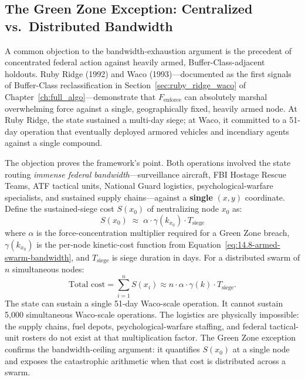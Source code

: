 \subsection{The Green Zone Exception: Centralized vs.\ Distributed Bandwidth}
\label{subsec:green_zone}

A common objection to the bandwidth-exhaustion argument is the precedent of concentrated federal action against heavily armed, Buffer-Class-adjacent holdouts. Ruby Ridge (1992) and Waco (1993)---documented as the first signals of Buffer-Class reclassification in Section~\ref{sec:ruby_ridge_waco} of Chapter~\ref{ch:full_algo}---demonstrate that $F_{\text{enforce}}$ can absolutely marshal overwhelming force against a single, geographically fixed, heavily armed node. At Ruby Ridge, the state sustained a multi-day siege; at Waco, it committed to a 51-day operation that eventually deployed armored vehicles and incendiary agents against a single compound.

The objection proves the framework's point. Both operations involved the state routing \textit{immense federal bandwidth}---surveillance aircraft, FBI Hostage Rescue Teams, ATF tactical units, National Guard logistics, psychological-warfare specialists, and sustained supply chains---against a \textbf{single} $(x, y)$ coordinate. Define the sustained-siege cost $S(x_0)$ of neutralizing node $x_0$ as:
\begin{equation}\label{eq:14.10-sustained-siege-cost}
S(x_0) \;\approx\; \alpha \cdot \gamma(k_{x_0}) \cdot T_{\text{siege}}
\end{equation}
where $\alpha$ is the force-concentration multiplier required for a Green Zone breach, $\gamma(k_{x_0})$ is the per-node kinetic-cost function from Equation~\eqref{eq:14.8-armed-swarm-bandwidth}, and $T_{\text{siege}}$ is siege duration in days. For a distributed swarm of $n$ simultaneous nodes:
\[
\text{Total cost} = \sum_{i=1}^{n} S(x_i) \approx n \cdot \alpha \cdot \gamma(k) \cdot T_{\text{siege}}.
\]
The state can sustain a single 51-day Waco-scale operation. It cannot sustain 5,000 simultaneous Waco-scale operations. The logistics are physically impossible: the supply chains, fuel depots, psychological-warfare staffing, and federal tactical-unit rosters do not exist at that multiplication factor. The Green Zone exception confirms the bandwidth-ceiling argument: it quantifies $S(x_0)$ at a single node and exposes the catastrophic arithmetic when that cost is distributed across a swarm.

